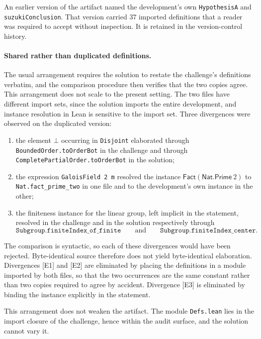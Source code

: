 \documentclass{article}
\begin{document}
An earlier version of the artifact named the development's own
\verb|HypothesisA| and \verb|suzukiConclusion|. That version carried 37 imported
definitions that a reader was required to accept without inspection. It is
retained in the version-control history.

\paragraph{Shared rather than duplicated definitions.}
The usual arrangement requires the solution to restate the challenge's
definitions verbatim, and the comparison procedure then verifies that the two
copies agree. This arrangement does not scale to the present setting. The two
files have different import sets, since the solution imports the entire
development, and instance resolution in Lean is sensitive to the import set.
Three divergences were observed on the duplicated version:
\begin{enumerate}
  \item[\textsc{[E1]}] the element \(\bot\) occurring in \texttt{Disjoint}
  elaborated through \texttt{BoundedOrder.toOrderBot} in the challenge and
  through \texttt{CompletePartialOrder.toOrderBot} in the solution;

  \item[\textsc{[E2]}] the expression \verb|GaloisField 2 m| resolved the
  instance \(\mathsf{Fact}(\mathsf{Nat.Prime}\ 2)\) to \verb|Nat.fact_prime_two|
  in one file and to the development's own instance in the other;

  \item[\textsc{[E3]}] the finiteness instance for the linear group, left
  implicit in the statement, resolved in the challenge and in the solution
  respectively through
  \[
    \texttt{Subgroup.finiteIndex\_of\_finite}
    \qquad\text{and}\qquad
    \texttt{Subgroup.finiteIndex\_center} .
  \]
\end{enumerate}
The comparison is syntactic, so each of these divergences would have been
rejected. Byte-identical source therefore does not yield byte-identical
elaboration. Divergences \textsc{[E1]} and \textsc{[E2]} are eliminated by
placing the definitions in a module imported by both files, so that the two
occurrences are the same constant rather than two copies required to agree by
accident. Divergence \textsc{[E3]} is eliminated by binding the instance
explicitly in the statement.

This arrangement does not weaken the artifact. The module \verb|Defs.lean| lies
in the import closure of the challenge, hence within the audit surface, and the
solution cannot vary it.
\end{document}

